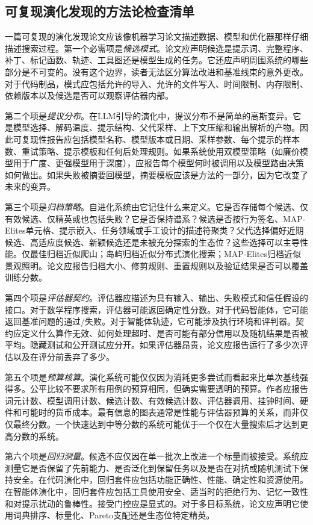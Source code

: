 \subsection{可复现演化发现的方法论检查清单}
\label{subsec:evolution-methodological-checklist}

一篇可复现的演化发现论文应该像机器学习论文描述数据、模型和优化器那样仔细描述搜索过程。第一个必需项是\emph{候选模式}。论文应声明候选是提示词、完整程序、补丁、标记函数、轨迹、工具图还是模型生成的任务。它还应声明周围系统的哪些部分是不可变的。没有这个边界，读者无法区分算法改进和基准线束的意外更改。对于代码制品，模式应包括允许的导入、允许的文件写入、时间限制、内存限制、依赖版本以及候选是否可以观察评估器内部。

第二个项是\emph{提议分布}。在LLM引导的演化中，提议分布不是简单的高斯变异。它是模型选择、解码温度、提示结构、父代采样、上下文压缩和输出解析的产物。因此可复现性报告应包括模型名称、模型版本或日期、采样参数、每个提示的样本数、重试策略、提示模板和任何后处理规则。如果系统使用双模型策略（如廉价模型用于广度、更强模型用于深度），应报告每个模型何时被调用以及模型路由决策如何做出。如果失败被摘要回模型，摘要模板应该是方法的一部分，因为它改变了未来的变异。

第三个项是\emph{归档策略}。自进化系统由它记住什么来定义。它是否存储每个候选、仅有效候选、仅精英或也包括失败？它是否保持谱系？候选是否按行为签名、MAP-Elites单元格、提示嵌入、任务领域或手工设计的描述符聚类？父代选择偏好近期候选、高适应度候选、新颖候选还是未被充分探索的生态位？这些选择可以主导性能。仅最佳归档近似爬山；岛屿归档近似分布式演化搜索；MAP-Elites归档近似景观照明。论文应报告归档大小、修剪规则、重置规则以及验证结果是否可以覆盖训练分数。

第四个项是\emph{评估器契约}。评估器应描述为具有输入、输出、失败模式和信任假设的接口。对于数学程序搜索，评估器可能返回确定性分数。对于代码智能体，它可能返回基准问题的通过/失败。对于智能体轨迹，它可能涉及执行环境和评判器。契约应定义什么算作无效、如何处理超时、是否可能有部分信用以及随机结果是否被平均。隐藏测试和公开测试应分开。如果评估器昂贵，论文应报告运行了多少次评估以及在评分前丢弃了多少。

第五个项是\emph{预算核算}。演化系统可能仅仅因为消耗更多尝试而看起来比单次基线强得多。公平比较不要求所有用例的预算相同，但确实需要透明的预算。作者应报告词元计数、模型调用计数、候选计数、有效候选计数、评估器调用、挂钟时间、硬件和可能时的货币成本。最有信息的图表通常是性能与评估器预算的关系，而非仅仅最终分数。一个快速达到中等分数的系统可能优于一个仅在大量搜索后才达到更高分数的系统。

第六个项是\emph{回归测量}。候选不应仅因在单一批次上改进一个标量而被接受。系统应测量它是否保留了先前能力、是否泛化到保留任务以及是否在对抗或随机测试下保持安全。在代码演化中，回归套件应包括功能正确性、性能、确定性和资源使用。在智能体演化中，回归套件应包括工具使用安全、适当时的拒绝行为、记忆一致性和对提示扰动的鲁棒性。接受门控应是显式的。对于多目标系统，论文应声明它使用词典排序、标量化、Pareto支配还是生态位特定精英。


